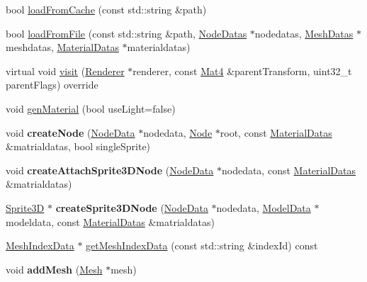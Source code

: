 \begin{DoxyCompactItemize}
\item 
bool \hyperlink{classSprite3D_aeeec351e43e4ccc2d1782bb7652db960}{load\+From\+Cache} (const std\+::string \&path)
\item 
bool \hyperlink{classSprite3D_a4927dfcc1a6cd4a2e7429b501da0d10d}{load\+From\+File} (const std\+::string \&path, \hyperlink{structNodeDatas}{Node\+Datas} $\ast$nodedatas, \hyperlink{structMeshDatas}{Mesh\+Datas} $\ast$meshdatas, \hyperlink{structMaterialDatas}{Material\+Datas} $\ast$materialdatas)
\item 
virtual void \hyperlink{classSprite3D_a7c6db1d1a851a0a1d2ca17f4c9ad8c67}{visit} (\hyperlink{classRenderer}{Renderer} $\ast$renderer, const \hyperlink{classMat4}{Mat4} \&parent\+Transform, uint32\+\_\+t parent\+Flags) override
\item 
void \hyperlink{classSprite3D_ac5fc3ddd4aef194a08a1a1285292b329}{gen\+Material} (bool use\+Light=false)
\item 
\mbox{\label{classSprite3D_a2922910b2034270d8361465aaea60b17}} 
void {\bfseries create\+Node} (\hyperlink{structNodeData}{Node\+Data} $\ast$nodedata, \hyperlink{classNode}{Node} $\ast$root, const \hyperlink{structMaterialDatas}{Material\+Datas} \&matrialdatas, bool single\+Sprite)
\item 
\mbox{\label{classSprite3D_ab6ff62e7d2d3e34b4160df9fb77a5967}} 
void {\bfseries create\+Attach\+Sprite3\+D\+Node} (\hyperlink{structNodeData}{Node\+Data} $\ast$nodedata, const \hyperlink{structMaterialDatas}{Material\+Datas} \&matrialdatas)
\item 
\mbox{\label{classSprite3D_ac78653cef601cfd73bf71cf888bd19f5}} 
\hyperlink{classSprite3D}{Sprite3D} $\ast$ {\bfseries create\+Sprite3\+D\+Node} (\hyperlink{structNodeData}{Node\+Data} $\ast$nodedata, \hyperlink{structModelData}{Model\+Data} $\ast$modeldata, const \hyperlink{structMaterialDatas}{Material\+Datas} \&matrialdatas)
\item 
\hyperlink{classMeshIndexData}{Mesh\+Index\+Data} $\ast$ \hyperlink{classSprite3D_a27d281cd27b2da08237b220b368bee2a}{get\+Mesh\+Index\+Data} (const std\+::string \&index\+Id) const
\item 
\mbox{\label{classSprite3D_aa0913954dfa85ef5ef15aaf30ce3b54f}} 
void {\bfseries add\+Mesh} (\hyperlink{classMesh}{Mesh} $\ast$mesh)
\item 

\end{DoxyCompactItemize}
